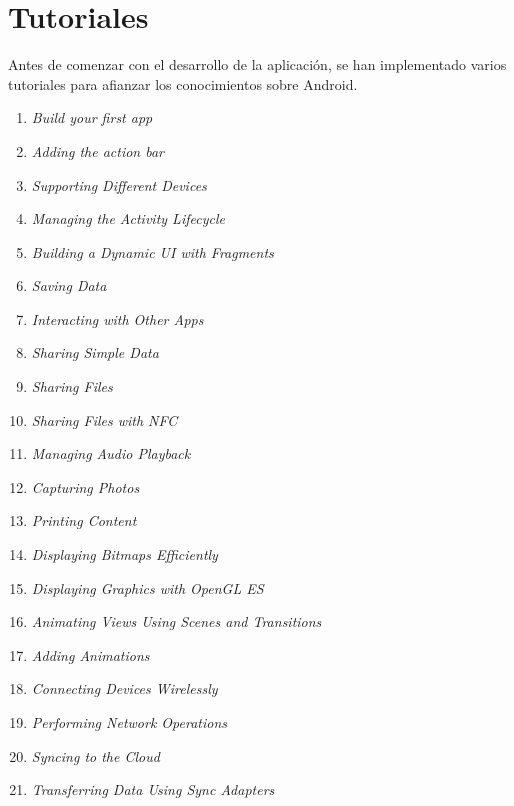 \newpage		
\section{Tutoriales}
	Antes de comenzar con el desarrollo de la aplicación, se han implementado varios tutoriales para afianzar los conocimientos sobre Android.
	\begin{enumerate}
		\item {\it Build your first app}\cite{29:firstapp:online} %
		\item {\it Adding the action bar}\cite{30:actionbar:online}
		\item {\it Supporting Different Devices}\cite{31:diferentdevices:online}
		\item {\it Managing the Activity Lifecycle}\cite{32:lifecycle:online}
		\item {\it Building a Dynamic UI with Fragments}\cite{33:fragments:online}
		\item {\it Saving Data}\cite{34:savingdata:online}
		\item {\it Interacting with Other Apps}\cite{35:interacting:online}
		\item {\it Sharing Simple Data}\cite{36:sharingsimpledata:online}
		\item {\it Sharing Files}\cite{37:sharingfiles:online}
		\item {\it Sharing Files with NFC}\cite{38:nfc:online}
		\item {\it Managing Audio Playback}\cite{39:audio:online}
		\item {\it Capturing Photos}\cite{40:photos:online}
		\item {\it Printing Content}\cite{41:printing:online}
		\item {\it Displaying Bitmaps Efficiently}\cite{42:bitmaps:online}
		\item {\it Displaying Graphics with OpenGL ES}\cite{43:opengl:online}
		\item {\it Animating Views Using Scenes and Transitions}\cite{44:transitions:online}
		\item {\it Adding Animations}\cite{45:animations:online}
		\item {\it Connecting Devices Wirelessly}\cite{46:connecting:online}
		\item {\it Performing Network Operations}\cite{47:networks:online}
		\item {\it Syncing to the Cloud}\cite{48:cloud:online}
		\item {\it Transferring Data Using Sync Adapters}\cite{49:adapters:online}

\end{enumerate}
